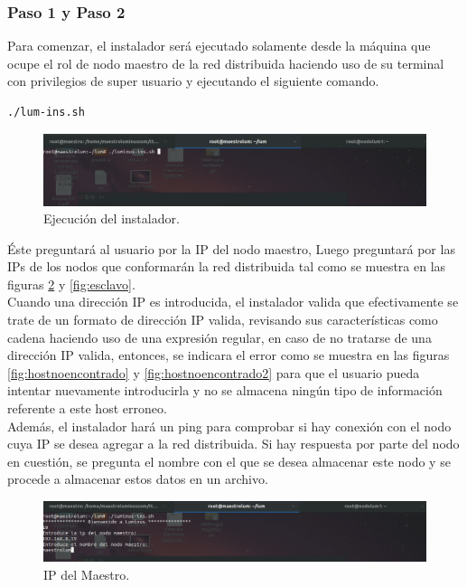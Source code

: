 \subsubsection{Paso 1 y Paso 2}
Para comenzar, el instalador será ejecutado solamente desde la máquina que ocupe el rol de nodo maestro de la red distribuida haciendo uso de su terminal con privilegios de super usuario y ejecutando el siguiente comando. 
\\
\begin{verbatim}
./lum-ins.sh
\end{verbatim}
\begin{figure}[H]
	\hypertarget{fig:ejecucion}{\hspace{1pt}}
	\begin{center}	
		\includegraphics[width=.4\textwidth]{capitulo5/images/ejecucion.png}
		\caption{Ejecución del instalador.}
		\label{fig:Ejecucion del instalador}
	\end{center}
\end{figure}
Éste preguntará al usuario por la IP del nodo maestro, Luego preguntará por las IPs de los nodos que conformarán la red distribuida tal como se muestra en las figuras \ref{fig:maestro} y \ref{fig:esclavo}. \\
Cuando una dirección IP es introducida, el instalador valida que efectivamente se trate de un formato de dirección IP valida, revisando sus características como cadena haciendo uso de una expresión regular, en caso de no tratarse de una dirección IP valida, entonces, se indicara el error como se muestra en las figuras \ref{fig:hostnoencontrado} y \ref{fig:hostnoencontrado2} para que el usuario pueda intentar nuevamente introducirla y no se almacena ningún tipo de información referente a este host erroneo.
\\
Además, el instalador hará un ping para comprobar si hay conexión con el nodo cuya IP se desea agregar a la red distribuida. Si hay respuesta por parte del nodo en cuestión, se pregunta el nombre con el que se desea almacenar este nodo y se procede a almacenar estos datos en un archivo.
\\
\begin{figure}[H]
	\begin{center}	
		\includegraphics[width=.5\textwidth]{capitulo5/images/ipmaestro.png}
		\caption{IP del Maestro.}
		\label{fig:maestro}
	\end{center}
\end{figure}
